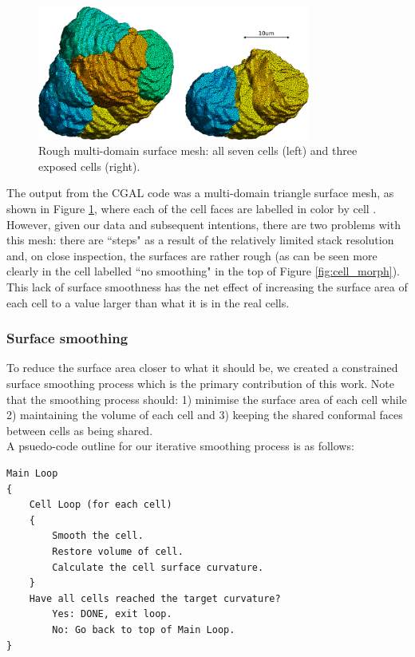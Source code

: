 \documentclass[a4paper,10pt]{article}
\begin{document}
\begin{figure}[H]
\begin{center}
\includegraphics[width=0.8\textwidth]{images/rough.pdf}
\end{center}
\caption{Rough multi-domain surface mesh: all seven cells (left) and three exposed cells (right).}
\label{fig:rough}
\end{figure}

The output from the CGAL code was a multi-domain triangle surface mesh, as shown in Figure \ref{fig:rough}, where each of the cell faces are labelled in color by cell . However, given our data and subsequent intentions, there are two problems with this mesh: there are ``steps" as a result of the relatively limited stack resolution and, on close inspection, the surfaces are rather rough (as can be seen more clearly in the cell labelled ``no smoothing" in the top of Figure \ref{fig:cell_morph}). This lack of surface smoothness has the net effect of increasing the surface area of each cell to a value larger than what it is in the real cells.\\

\subsubsection{Surface smoothing}

To reduce the surface area closer to what it should be, we created a constrained surface smoothing process which is the primary contribution of this work. Note that the smoothing process should: 1) minimise the surface area of each cell while 2) maintaining the volume of each cell and 3) keeping the shared conformal faces between cells as being shared.\\

A psuedo-code outline for our iterative smoothing process is as follows:
\begin{verbatim}
Main Loop
{
    Cell Loop (for each cell)
    {
        Smooth the cell.
        Restore volume of cell.
        Calculate the cell surface curvature.
    }
    Have all cells reached the target curvature?
        Yes: DONE, exit loop.
        No: Go back to top of Main Loop.  
}
\end{verbatim}
\end{document}
